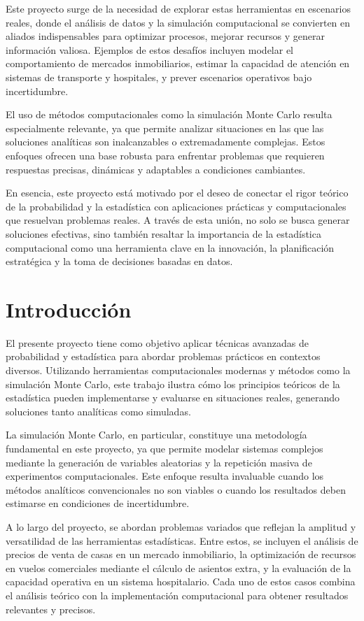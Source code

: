 \documentclass[12pt]{article}
\begin{document}
Este proyecto surge de la necesidad de explorar estas herramientas en escenarios reales, donde el análisis de datos y la simulación computacional se convierten en aliados indispensables para optimizar procesos, mejorar recursos y generar información valiosa. Ejemplos de estos desafíos incluyen modelar el comportamiento de mercados inmobiliarios, estimar la capacidad de atención en sistemas de transporte y hospitales, y prever escenarios operativos bajo incertidumbre.

El uso de métodos computacionales como la simulación Monte Carlo resulta especialmente relevante, ya que permite analizar situaciones en las que las soluciones analíticas son inalcanzables o extremadamente complejas. Estos enfoques ofrecen una base robusta para enfrentar problemas que requieren respuestas precisas, dinámicas y adaptables a condiciones cambiantes.

En esencia, este proyecto está motivado por el deseo de conectar el rigor teórico de la probabilidad y la estadística con aplicaciones prácticas y computacionales que resuelvan problemas reales. A través de esta unión, no solo se busca generar soluciones efectivas, sino también resaltar la importancia de la estadística computacional como una herramienta clave en la innovación, la planificación estratégica y la toma de decisiones basadas en datos.

\section{Introducción}

El presente proyecto tiene como objetivo aplicar técnicas avanzadas de probabilidad y estadística para abordar problemas prácticos en contextos diversos. Utilizando herramientas computacionales modernas y métodos como la simulación Monte Carlo, este trabajo ilustra cómo los principios teóricos de la estadística pueden implementarse y evaluarse en situaciones reales, generando soluciones tanto analíticas como simuladas.

La simulación Monte Carlo, en particular, constituye una metodología fundamental en este proyecto, ya que permite modelar sistemas complejos mediante la generación de variables aleatorias y la repetición masiva de experimentos computacionales. Este enfoque resulta invaluable cuando los métodos analíticos convencionales no son viables o cuando los resultados deben estimarse en condiciones de incertidumbre. 

A lo largo del proyecto, se abordan problemas variados que reflejan la amplitud y versatilidad de las herramientas estadísticas. Entre estos, se incluyen el análisis de precios de venta de casas en un mercado inmobiliario, la optimización de recursos en vuelos comerciales mediante el cálculo de asientos extra, y la evaluación de la capacidad operativa en un sistema hospitalario. Cada uno de estos casos combina el análisis teórico con la implementación computacional para obtener resultados relevantes y precisos.
\end{document}
